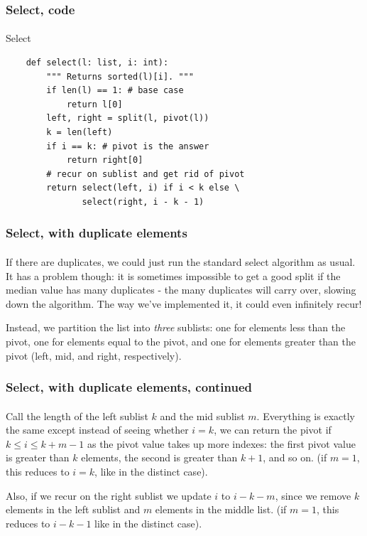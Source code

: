 \documentclass{beamer}                             %
\begin{document}
\begin{frame}[fragile]
\frametitle{Select, code}
\framesubtitle{}
\begin{algorithm}[H]
  \caption{Select}
  \begin{verbatim}
    def select(l: list, i: int):
        """ Returns sorted(l)[i]. """
        if len(l) == 1: # base case
            return l[0]
        left, right = split(l, pivot(l))
        k = len(left)
        if i == k: # pivot is the answer
            return right[0]
        # recur on sublist and get rid of pivot
        return select(left, i) if i < k else \
               select(right, i - k - 1)
  \end{verbatim}
\end{algorithm}
\end{frame}

\begin{frame}
\frametitle{Select, with duplicate elements}
\framesubtitle{}
If there are duplicates, we could just run the standard select algorithm
as usual. It has a problem though: it is sometimes impossible to get a good
split if the median value has many duplicates - the many duplicates will
carry over, slowing down the algorithm. The way we've implemented it, it could
even infinitely recur! \pause

Instead, we partition the list into \textit{three} sublists: one for elements
less than the pivot, one for elements equal to the pivot, and one for elements
greater than the pivot (left, mid, and right, respectively).
\end{frame}

\begin{frame}
\frametitle{Select, with duplicate elements, continued}
\framesubtitle{}
Call the length of the left sublist \( k \) and the mid sublist \( m \).
Everything is exactly the same except instead of seeing whether \( i = k \),
we can return the pivot if \( k \leq i \leq k + m - 1 \) as the pivot value 
takes up more indexes: the first pivot value is greater than \( k \) elements,
the second is greater than \( k + 1 \), and so on.
(if \( m = 1 \), this reduces to \( i = k \), like in the distinct case). \pause

Also, if we recur on the right sublist we update \( i \) to \( i - k - m \),
since we remove \( k \) elements in the left sublist and \( m \) elements
in the middle list.
(if \( m = 1 \), this reduces to \( i - k - 1 \) like in the distinct case).
\end{frame}
\end{document}

